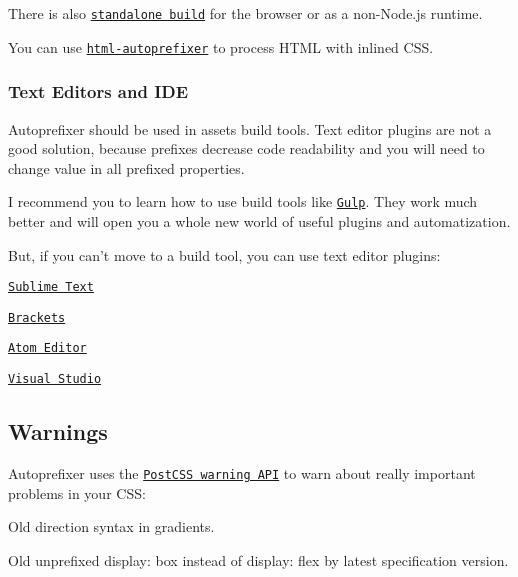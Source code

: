 There is also \href{https://raw.github.com/ai/autoprefixer-rails/master/vendor/autoprefixer.js}{\tt standalone build} for the browser or as a non-\/\+Node.\+js runtime.

You can use \href{https://github.com/RebelMail/html-autoprefixer}{\tt html-\/autoprefixer} to process H\+T\+ML with inlined C\+SS.

\subsubsection*{Text Editors and I\+DE}

Autoprefixer should be used in assets build tools. Text editor plugins are not a good solution, because prefixes decrease code readability and you will need to change value in all prefixed properties.

I recommend you to learn how to use build tools like \href{http://gulpjs.com/}{\tt Gulp}. They work much better and will open you a whole new world of useful plugins and automatization.

But, if you can’t move to a build tool, you can use text editor plugins\+:


\begin{DoxyItemize}
\item \href{https://github.com/sindresorhus/sublime-autoprefixer}{\tt Sublime Text}
\item \href{https://github.com/mikaeljorhult/brackets-autoprefixer}{\tt Brackets}
\item \href{https://github.com/sindresorhus/atom-autoprefixer}{\tt Atom Editor}
\item \href{http://vswebessentials.com/}{\tt Visual Studio}
\end{DoxyItemize}

\subsection*{Warnings}

Autoprefixer uses the \href{https://github.com/postcss/postcss/blob/master/docs/api.md#warning-class}{\tt Post\+C\+SS warning A\+PI} to warn about really important problems in your C\+SS\+:


\begin{DoxyItemize}
\item Old direction syntax in gradients.
\item Old unprefixed {\ttfamily display\+: box} instead of {\ttfamily display\+: flex} by latest specification version.
\end{DoxyItemize}


